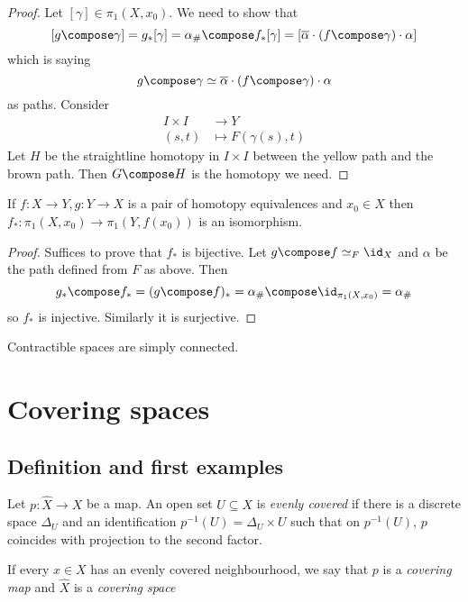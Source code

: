 \documentclass[a4paper]{article}
\begin{document}
\begin{proof}
  Let \([\gamma] \in \pi_1(X, x_0)\). We need to show that
  \[
    [g \compose \gamma] = g_*[\gamma] = \alpha_\# \compose f_*[\gamma] = [\overline \alpha \cdot (f \compose \gamma) \cdot \alpha]
  \]
  which is saying
  \[
    g \compose \gamma \simeq \overline \alpha \cdot (f \compose \gamma) \cdot \alpha
  \]
  as paths. Consider
  \begin{align*}
    I \times I &\to Y \\
    (s, t) &\mapsto F(\gamma(s), t)
  \end{align*}
  Let \(H\) be the straightline homotopy in \(I \times I\) between the yellow path and the brown path. Then \(G \compose H\) is the homotopy we need.
\end{proof}

\begin{theorem}
  If \(f: X \to Y, g: Y \to X\) is a pair of homotopy equivalences and \(x_0 \in X\) then \(f_*: \pi_1(X, x_0) \to \pi_1(Y, f(x_0))\) is an isomorphism.
\end{theorem}

\begin{proof}
  Suffices to prove that \(f_*\) is bijective. Let \(g \compose f \simeq_F \id_X\) and \(\alpha\) be the path defined from \(F\) as above. Then
  \[
    g_* \compose f_* = (g \compose f)_* = \alpha_\# \compose \id_{\pi_1(X, x_0)} = \alpha_\#
  \]
  so \(f_*\) is injective. Similarly it is surjective.
\end{proof}

\begin{corollary}
  Contractible spaces are simply connected.
\end{corollary}

\section{Covering spaces}

\subsection{Definition and first examples}

\begin{definition}
  Let \(p: \hat X \to X\) be a map. An open set \(U \subseteq X\) is \emph{evenly covered} if there is a discrete space \(\Delta_U\) and an identification \(p^{-1}(U) = \Delta_U \times U\) such that on \(p^{-1}(U)\), \(p\) coincides with projection to the second factor.

  If every \(x \in X\) has an evenly covered neighbourhood, we say that \(p\) is a \emph{covering map} and \(\hat X\) is a \emph{covering space}
\end{definition}
\end{document}
